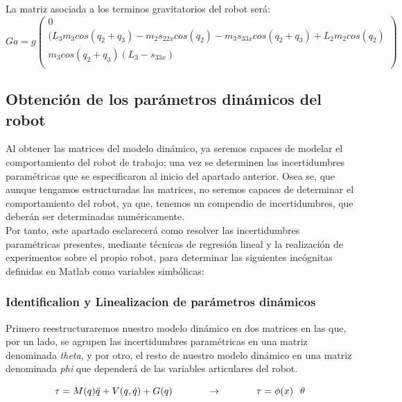La matriz asociada a los terminos gravitatorios del robot será:
	\[
	Ga=g
	\begin{pmatrix}
	0\\
	(L_{3}m_{3}cos(q_{2}+q_{3})-m_{2}s_{22x}cos(q_{2})-m_{3}s_{33x}cos(q_{2}+q_{3})+L_{2}m_{2}cos(q_{2})\\
	m_{3}cos(q_{2}+q_{3})(L_{3}-s_{33x})\\
\end{pmatrix} \]


	\subsection{Obtención de los parámetros dinámicos del robot}
	Al obtener las matrices del modelo dinámico, ya seremos capaces de modelar el comportamiento del robot de trabajo;
una vez se determinen las incertidumbres paramétricas que se especificaron al inicio del apartado anterior.
Osea se, que aunque tengamos estructuradas las matrices, no seremos capaces de determinar el comportamiento
del robot, ya que, tenemos un compendio de incertidumbres, que deberán ser determinadas numéricamente.\\

Por tanto, este apartado esclarecerá como resolver las incertidumbres paramétricas presentes, mediante
técnicas de regresión lineal y la realización de experimentos sobre el propio robot, para determinar las siguientes
incógnitas definidas en Matlab como variables simbólicas:

	\subsubsection{Identificalion y Linealizacion de parámetros dinámicos}
		Primero reestructuraremos nuestro modelo dinámico en dos matrices en las que, por un lado,
		se agrupen las incertidumbres paramétricas en una matriz denominada \textit{theta}, y por otro, el resto de nuestro modelo
		dinámico en una matriz denominada \textit{phi} que dependerá de las variables articulares del robot.

		\begin{equation}
			\tau=M(q)\ddot{q}+V(q,\dot{q})+G(q) \hspace{1.25cm}  \rightarrow \hspace{1.25cm} \tau=\phi(x) \hspace{0.25cm} \theta
			\end{equation}


